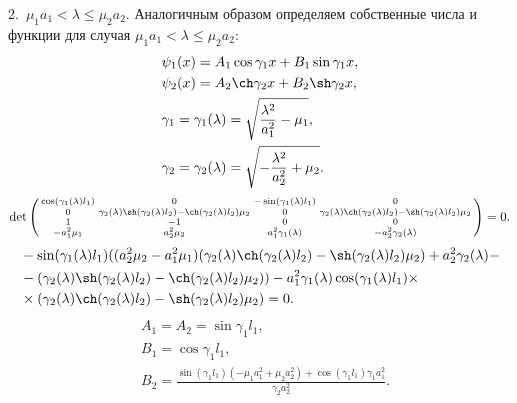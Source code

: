 \documentclass[12pt, a4paper]{article}
\begin{document}
2.\ $ \mu_1a_1 < \lambda \le \mu_2a_2 $. Аналогичным образом определяем собственные числа и функции для случая $ \mu_1a_1 < \lambda \le \mu_2a_2 $:
\begin{equation}
  \begin{aligned}
    & \psi_1(x) = A_1 \cos \gamma_1x + B_1 \sin \gamma_1x, \\
    & \psi_2(x) = A_2 \ch \gamma_2x + B_2 \sh \gamma_2x, \\
    & \gamma_1 = \gamma_1(\lambda) = \sqrt{\frac{\lambda^2}{a_1^2} - \mu_1}, \\
    & \gamma_2 = \gamma_2(\lambda) = \sqrt{- \frac{\lambda^2}{a_2^2} + \mu_2}.
  \end{aligned}
  \label{eq:6}
\end{equation}
\begin{equation}
  \det \left(  
  \begin{smallmatrix}
    \cos(\gamma_1(\lambda) l_1) & 0 & -\sin(\gamma_1(\lambda) l_1) & 0 \\
    0 & \gamma_2(\lambda) \sh(\gamma_2(\lambda) l_2)-\ch(\gamma_2(\lambda) l_2) \mu_2 & 0 & \gamma_2(\lambda) \ch(\gamma_2(\lambda) l_2)-\sh(\gamma_2(\lambda) l_2) \mu_2 \\
    1 & -1 & 0 & 0 \\
    -a_1^2 \mu_1 & a_2^2 \mu_2 & a_1^2 \gamma_1(\lambda) & -a_2^2 \gamma_2(\lambda) \\
  \end{smallmatrix}
  \right) = 0.
\end{equation}
\begin{equation}
  \begin{aligned}
  & -\sin(\gamma_1(\lambda) l_1) ((a_2^2 \mu_2-a_1^2 \mu_1) (\gamma_2(\lambda) \ch(\gamma_2(\lambda) l_2)-\sh(\gamma_2(\lambda) l_2) \mu_2)+a_2^2 \gamma_2(\lambda)- \\
  & -(\gamma_2(\lambda) \sh(\gamma_2(\lambda) l_2)-\ch(\gamma_2(\lambda) l_2) \mu_2))-a_1^2 \gamma_1(\lambda) \cos(\gamma_1(\lambda) l_1) \times \\
  & \times (\gamma_2(\lambda) \ch(\gamma_2(\lambda) l_2)-\sh(\gamma_2(\lambda) l_2) \mu_2) = 0.
  \end{aligned}
\end{equation}
\begin{equation}
  \begin{aligned}
    & A_1 = A_2 = \sin \gamma_1l_1, \\
    & B_1 = \cos \gamma_1l_1, \\
    & B_2 = \frac{\sin (\gamma_1l_1) (-\mu_1 a_1^2 + \mu_2 a_2^2) + \cos (\gamma_1l_1) \gamma_1 a_1^2}{\gamma_2a_2^2}.
  \end{aligned}
\end{equation}
\end{document}
